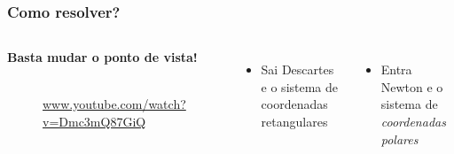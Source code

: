 \documentclass[pdftex, brazil, aspectratio=169]{beamer}
\begin{document}
\begin{frame}[t]
  \frametitle{Como resolver?}
  \begin{columns}
    \centering
  \begin{block}{\textbf{Basta mudar o ponto de vista!}}
    \begin{figure}[H]
      \begin{center}
        \label{fig:int2-06}
        \href{run:imagens/pview.mp4}{
        }\\
        \footnotesize{\url{www.youtube.com/watch?v=Dmc3mQ87GiQ}}
      \end{center}
    \end{figure}
  \end{block}
    \centering
    \begin{itemize}
    \item Sai Descartes e o sistema de coordenadas retangulares
    \end{itemize}
    \vspace{1cm}
    \begin{itemize}
    \item Entra Newton e o sistema de \emph{coordenadas polares}
    \end{itemize}
  \end{columns}
\end{frame}
\end{document}
